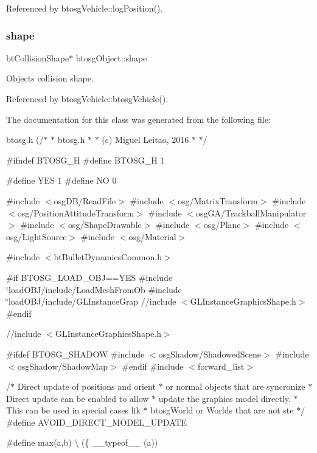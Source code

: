 Referenced by btosg\+Vehicle\+::log\+Position().

\mbox{\label{classbtosgObject_a0f6a8da01cf643c321bffe86e42604b0}} 
\subsubsection{\texorpdfstring{shape}{shape}}
{\footnotesize\ttfamily bt\+Collision\+Shape$\ast$ btosg\+Object\+::shape\hspace{0.3cm}{\ttfamily [inherited]}}



Object\textquotesingle{}s collision shape. 



Referenced by btosg\+Vehicle\+::btosg\+Vehicle().



The documentation for this class was generated from the following file\+:\begin{DoxyCompactItemize}
\item 
btosg.\+h (/$\ast$
 $\ast$	btosg.\+h
 $\ast$
 $\ast$	(c) Miguel Leitao, 2016
 $\ast$
 $\ast$/

\#ifndef B\+T\+O\+S\+G\+\_\+\+H
\#define B\+T\+O\+S\+G\+\_\+\+H 1

\#define Y\+E\+S 1
\#define N\+O  0

\#include $<$osg\+D\+B/\+Read\+File$>$
\#include $<$osg/\+Matrix\+Transform$>$
\#include $<$osg/\+Position\+Attitude\+Transform$>$
\#include $<$osg\+G\+A/\+Trackball\+Manipulator$>$
\#include $<$osg/\+Shape\+Drawable$>$
\#include $<$osg/\+Plane$>$
\#include $<$osg/\+Light\+Source$>$
\#include $<$osg/\+Material$>$

\#include $<$bt\+Bullet\+Dynamics\+Common.\+h$>$

\#if B\+T\+O\+S\+G\+\_\+\+L\+O\+A\+D\+\_\+\+O\+B\+J==\+Y\+E\+S
\#include \char`\"{}load\+O\+B\+J/include/\+Load\+Mesh\+From\+Ob
\#include \char`\"{}load\+O\+B\+J/include/\+G\+L\+Instance\+Grap
//include $<$\+G\+L\+Instance\+Graphics\+Shape.\+h$>$
\#endif

//include $<$\+G\+L\+Instance\+Graphics\+Shape.\+h$>$

\#ifdef B\+T\+O\+S\+G\+\_\+\+S\+H\+A\+D\+O\+W
\#include $<$osg\+Shadow/\+Shadowed\+Scene$>$
\#include $<$osg\+Shadow/\+Shadow\+Map$>$
\#endif
\#include $<$forward\+\_\+list$>$

/$\ast$ Direct update of positions and orient
 $\ast$ or normal objects that are syncronize
 $\ast$ Direct update can be enabled to allow
 $\ast$ update the graphics model directly.
 $\ast$ This can be used in special cases lik
 $\ast$ btosg\+World or Worlds that are not ste
 $\ast$/
\#define A\+V\+O\+I\+D\+\_\+\+D\+I\+R\+E\+C\+T\+\_\+\+M\+O\+D\+E\+L\+\_\+\+U\+P\+D\+A\+T\+E

\#define max(a,b) \textbackslash{}
   (\{ \+\_\+\+\_\+typeof\+\_\+\+\_\+ (a))\end{DoxyCompactItemize}
